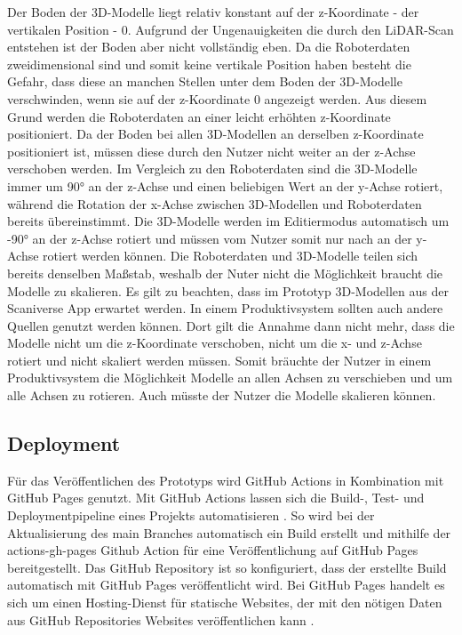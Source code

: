 Der Boden der 3D-Modelle liegt relativ konstant auf der z-Koordinate - der vertikalen Position - 0. Aufgrund der Ungenauigkeiten die durch den \ac{LiDAR}-Scan entstehen ist der Boden aber nicht vollständig eben. Da die Roboterdaten zweidimensional sind und somit keine vertikale Position haben besteht die Gefahr, dass diese an manchen Stellen unter dem Boden der 3D-Modelle verschwinden, wenn sie auf der z-Koordinate 0 angezeigt werden. Aus diesem Grund werden die Roboterdaten an einer leicht erhöhten z-Koordinate positioniert. Da der Boden bei allen 3D-Modellen an derselben z-Koordinate positioniert ist, müssen diese durch den Nutzer nicht weiter an der z-Achse verschoben werden. Im Vergleich zu den Roboterdaten sind die 3D-Modelle immer um 90° an der z-Achse und einen beliebigen Wert an der y-Achse rotiert, während die Rotation der x-Achse zwischen 3D-Modellen und Roboterdaten bereits übereinstimmt. Die 3D-Modelle werden im Editiermodus automatisch um -90° an der z-Achse rotiert und müssen vom Nutzer somit nur nach an der y-Achse rotiert werden können. Die Roboterdaten und 3D-Modelle teilen sich bereits denselben Maßstab, weshalb der Nuter nicht die Möglichkeit braucht die Modelle zu skalieren. Es gilt zu beachten, dass im Prototyp 3D-Modellen aus der Scaniverse App erwartet werden. In einem Produktivsystem sollten auch andere Quellen genutzt werden können. Dort gilt die Annahme dann nicht mehr, dass die Modelle nicht um die z-Koordinate verschoben, nicht um die x- und z-Achse rotiert und nicht skaliert werden müssen. Somit bräuchte der Nutzer in einem Produktivsystem die Möglichkeit Modelle an allen Achsen zu verschieben und um alle Achsen zu rotieren. Auch müsste der Nutzer die Modelle skalieren können.

\subsection{Deployment}

Für das Veröffentlichen des Prototyps wird GitHub Actions in Kombination mit GitHub Pages genutzt. Mit GitHub Actions lassen sich die Build-, Test- und Deploymentpipeline eines Projekts automatisieren \cite{GitHubActions}. So wird bei der Aktualisierung des main Branches automatisch ein Build erstellt und mithilfe der actions-gh-pages Github Action für eine Veröffentlichung auf GitHub Pages bereitgestellt. Das GitHub Repository ist so konfiguriert, dass der erstellte Build automatisch mit GitHub Pages veröffentlicht wird. Bei GitHub Pages handelt es sich um einen Hosting-Dienst für statische Websites, der mit den nötigen Daten aus GitHub Repositories Websites veröffentlichen kann \cite{GitHubPages}.

